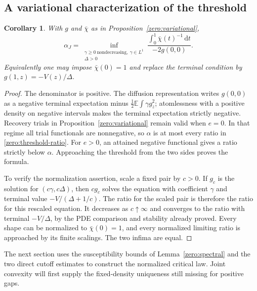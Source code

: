 \documentclass[11pt,a4paper]{article}
\numberwithin{equation}{section}
\newtheorem{corollary}[theorem]{Corollary}
\theoremstyle{definition}
\theoremstyle{remark}
\newcommand{\E}{\mathbb E}
\newcommand{\dd}{\mathrm d}
\begin{document}
\subsection{A variational characterization of the threshold}

\begin{corollary}\label{zero:threshold-characterization}
With \(g\) and \(\bar\chi\) as in Proposition~\ref{zero:variational},
\begin{equation}\label{zero:threshold-ratio}
 \alpha_J=\inf_{\substack{\gamma\ge0\ \mathrm{nondecreasing},\ \gamma\in L^1\\
                         \Delta>0}}
 \frac{\displaystyle\int_0^1\bar\chi(t)^{-1}\,\dd t}
      {-2g(0,0)}.
\end{equation}
Equivalently one may impose \(\bar\chi(0)=1\) and replace the
terminal condition by \(g(1,z)=-V(z)/\Delta\).
\end{corollary}

\begin{proof}
The denominator is positive.  The diffusion representation writes
\(g(0,0)\) as a negative terminal expectation minus
\(\frac12\E\int\gamma g_z^2\); atomlessness with a positive density
on negative intervals makes the terminal expectation strictly
negative.  Recovery trials in Proposition~\ref{zero:variational}
remain valid when \(e=0\).  In that regime all trial functionals
are nonnegative, so \(\alpha\) is at most every ratio in
\eqref{zero:threshold-ratio}.  For \(e>0\), an attained negative
functional gives a ratio strictly below \(\alpha\).
Approaching the threshold from the two sides proves the formula.

To verify the normalization assertion, scale a fixed pair by
\(c>0\).  If \(g_c\) is the solution for \((c\gamma,c\Delta)\),
then \(c g_c\) solves the equation with coefficient \(\gamma\) and
terminal value \(-V/(\Delta+1/c)\).  The ratio for the scaled pair
is therefore the ratio for this rescaled equation.  It decreases
as \(c\uparrow\infty\) and converges to the ratio with terminal
\(-V/\Delta\), by the PDE comparison and stability already proved.
Every shape can be normalized to \(\bar\chi(0)=1\), and every
normalized limiting ratio is approached by its finite scalings.
The two infima are equal.
\end{proof}

The next section uses the susceptibility bounds of
Lemma~\ref{zero:spectral} and the two direct cutoff estimates to
construct the normalized critical law.  Joint convexity will first
supply the fixed-density uniqueness still missing for positive gaps.
\end{document}
